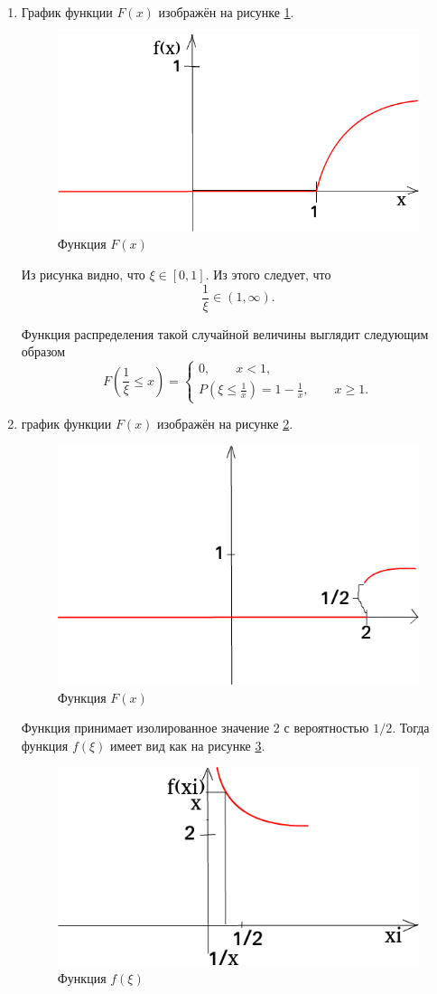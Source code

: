 \begin{enumerate}[label=\alph*)]
\item График функции $F \left( x \right) $ изображён на рисунке \ref{fig:915}.

\begin{figure}[h!]
  \centering
  \includegraphics[width=.4\textwidth]{./pictures/9_15.png}
  \caption{Функция $F \left( x \right) $}
  \label{fig:915}
\end{figure}

Из рисунка видно, что $ \xi \in \left[ 0, 1 \right] $.
Из этого следует, что
$$ \frac{1}{ \xi } \in \left( 1, \infty \right).$$

Функция распределения такой случайной величины выглядит следующим образом
$$F \left( \frac{1}{ \xi } \leq x \right) =
\begin{cases}
0, \qquad x < 1, \\
P \left( \xi \leq \frac{1}{x} \right) =
1 - \frac{1}{x}, \qquad x \geq 1.
\end{cases}$$

\item график функции $F \left( x \right) $ изображён на рисунке \ref{fig:9151}.

\begin{figure}[h!]
  \centering
  \includegraphics[width=.4\textwidth]{./pictures/9_15_1.png}
  \caption{Функция $F \left( x \right) $}
  \label{fig:9151}
\end{figure}

Функция принимает изолированное значение 2 с вероятностью $1/2$.
Тогда функция $f \left( \xi \right) $ имеет вид как на рисунке \ref{fig:9152}.

\begin{figure}[h!]
  \centering
  \includegraphics[width=.4\textwidth]{./pictures/9_15_2.png}
  \caption{Функция $f \left( \xi \right) $}
  \label{fig:9152}
\end{figure}


\end{enumerate}
